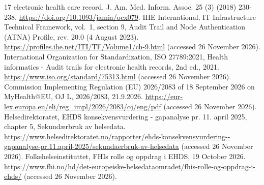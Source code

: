 \documentclass[preprint,review,12pt]{elsarticle}
\begin{document}
\begin{thebibliography}{17}
electronic health care record, J. Am. Med. Inform. Assoc. 25 (3) (2018)
230-238. \url{https://doi.org/10.1093/jamia/ocx079}.
 IHE International, IT Infrastructure Technical Framework,
vol.~1, section 9, Audit Trail and Node Authentication (ATNA) Profile,
rev. 20.0 (4 August 2023).
\url{https://profiles.ihe.net/ITI/TF/Volume1/ch-9.html} (accessed 26
November 2026).
 International Organization for Standardization, ISO 27789:2021,
Health informatics - Audit trails for electronic health records, 2nd
ed., 2021. \url{https://www.iso.org/standard/75313.html} (accessed 26
November 2026).
 Commission Implementing Regulation (EU) 2026/2083 of 18
September 2026 on MyHealth@EU, OJ L, 2026/2083, 21.9.2026.
\url{https://eur-lex.europa.eu/eli/reg_impl/2026/2083/oj/eng/pdf}
(accessed 26 November 2026).
 Helsedirektoratet, EHDS konsekvensvurdering - gapanalyse pr.
11. april 2025, chapter 5, Sekundærbruk av helsedata.
\url{https://www.helsedirektoratet.no/rapporter/ehds-konsekvensvurdering--gapanalyse-pr.11.april-2025/sekundaerbruk-av-helsedata}
(accessed 26 November 2026).
 Folkehelseinstituttet, FHIs rolle og oppdrag i EHDS, 19 October
2026.
\url{https://www.fhi.no/hd/det-europeiske-helsedataomradet/fhis-rolle-og-oppdrag-i-ehds/}
(accessed 26 November 2026).
\end{thebibliography}
\end{document}
